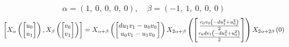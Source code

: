 \documentclass[11pt]{article}
\theoremstyle{definition}
\begin{document}
\[
\alpha = \left( 1, \  0, \  0, \  0, \  0\right), \quad \beta = \left( -1, \  1, \  0, \  0, \  0\right)
\]
\[
\scaletoalign{\textwidth}{\left[ X_{\alpha}\left(\left[\begin{matrix}u_{0}\\u_{1}\end{matrix}\right]\right), X_{\beta}\left(\left[\begin{matrix}v_{0}\\v_{1}\end{matrix}\right]\right) \right] = X_{\alpha + \beta}\left(\left[\begin{matrix}d u_{1} v_{1} - u_{0} v_{0}\\u_{0} v_{1} - u_{1} v_{0}\end{matrix}\right]\right) X_{2\alpha + \beta}\left(\left[\begin{matrix}\frac{c_{0} v_{0} \left(- d u_{1}^{2} + u_{0}^{2}\right)}{2}\\\frac{c_{0} d v_{1} \left(- d u_{1}^{2} + u_{0}^{2}\right)}{2}\end{matrix}\right]\right) X_{2\alpha + 2\beta}\left(0\right)}
\]
\end{document}
